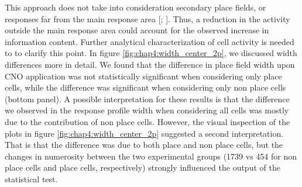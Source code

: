 This approach does not take into consideration secondary place fields, or responses far from the main response area [\cite{danielson2016sublayer}; \cite{zaremba2017impaired}]. 
Thus, a reduction in the activity outside the main response area could account for the observed increase in information content. 
Further analytical characterization of cell activity is needed to to clarify this point. 
In figure \ref{fig:chap4:width_center_2p}, we discussed width differences more in detail.
We found that the difference in place field width upon CNO application was not statistically significant when considering only place cells, while the difference was significant when considering only non place cells (bottom panel). 
A possible interpretation for these results is that the difference we observed in the response profile width when considering all cells was mostly due to the contribution of non place cells. 
However, the visual inspection of the plots in figure \ref{fig:chap4:width_center_2p} suggested a second interpretation. 
That is that the difference was due to both place and non place cells, but the changes in numerosity between the two experimental groups (1739 vs 454 for non place cells and place cells, respectively) strongly influenced the output of the statistical test.

